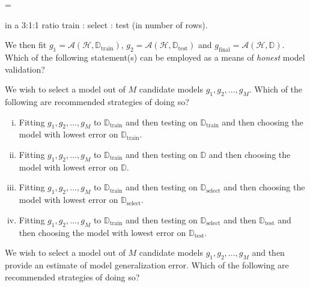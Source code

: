\documentclass[12pt]{article}
\begin{document}
\beqn
{} = 
\eeqn

\noindent in a 3:1:1 ratio train : select : test (in number of rows). 

We then fit $g_1 = \mathcal{A}(\mathcal{H}, \mathbb{D}_{\text{train}})$, $g_2 = \mathcal{A}(\mathcal{H}, \mathbb{D}_{\text{test}})$ and $g_{\text{final}} = \mathcal{A}(\mathcal{H}, \mathbb{D})$. Which of the following statement(s) can be employed as a means of \textit{honest} model validation?

\benum
{} We wish to select a model out of $M$ candidate models $g_1, g_2, \ldots, g_M$. Which of the following are recommended strategies of doing so?

\begin{enumerate}[i)]
\item Fitting $g_1, g_2, \ldots, g_M$ to $\mathbb{D}_{\text{train}}$ and then testing on $\mathbb{D}_{\text{train}}$ and then choosing the model with lowest error on $\mathbb{D}_{\text{train}}$.
\item Fitting $g_1, g_2, \ldots, g_M$ to $\mathbb{D}_{\text{train}}$ and then testing on $\mathbb{D}$ and then choosing the model with lowest error on $\mathbb{D}$.
\item Fitting $g_1, g_2, \ldots, g_M$ to $\mathbb{D}_{\text{train}}$ and then testing on $\mathbb{D}_{\text{select}}$ and then choosing the model with lowest error on $\mathbb{D}_{\text{select}}$.
\item Fitting $g_1, g_2, \ldots, g_M$ to $\mathbb{D}_{\text{train}}$ and then testing on $\mathbb{D}_{\text{select}}$ and then $\mathbb{D}_{\text{test}}$ and then choosing the model with lowest error on $\mathbb{D}_{\text{test}}$.
\end{enumerate}

 We wish to select a model out of $M$ candidate models $g_1, g_2, \ldots, g_M$ and then provide an estimate of model generalization error. Which of the following are recommended strategies of doing so?
\end{document}
